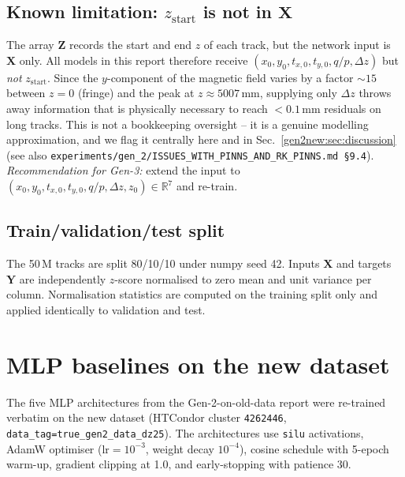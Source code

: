 \documentclass[a4paper,11pt]{article}
\newcommand{\qop}{q/p}
\newcommand{\dz}{\Delta z}
\begin{document}
\subsection{Known limitation: $z_{\mathrm{start}}$ is not in $\mathbf{X}$}

The array $\mathbf{Z}$ records the start and end $z$ of each track, but
the network input is $\mathbf{X}$ only. All models in this report
therefore receive $(x_0,y_0,t_{x,0},t_{y,0},\qop,\dz)$ but \emph{not}
$z_{\mathrm{start}}$. Since the $y$-component of the magnetic field
varies by a factor ${\sim}15$ between $z=0$ (fringe) and the peak at
$z\approx5007$\,mm, supplying only $\dz$ throws away information
that is physically necessary to reach ${<}0.1$\,mm residuals on long
tracks. This is not a bookkeeping oversight -- it is a genuine
modelling approximation, and we flag it centrally here and in
Sec.~\ref{gen2new:sec:discussion} (see also
\texttt{experiments/gen\_2/ISSUES\_WITH\_PINNS\_AND\_RK\_PINNS.md
\S9.4}). \emph{Recommendation for Gen-3:} extend the input to
$(x_0,y_0,t_{x,0},t_{y,0},\qop,\dz,z_0)\in\mathbb{R}^{7}$ and
re-train.

\subsection{Train/validation/test split}

The 50\,M tracks are split 80/10/10 under numpy seed 42.
Inputs $\mathbf{X}$ and targets $\mathbf{Y}$ are independently
$z$-score normalised to zero mean and unit variance per column.
Normalisation statistics are computed on the training split only and
applied identically to validation and test.

\section{MLP baselines on the new dataset}\label{gen2new:sec:mlp_baselines}

The five MLP architectures from the Gen-2-on-old-data report were
re-trained verbatim on the new dataset (HTCondor cluster
\texttt{4262446}, \texttt{data\_tag=true\_gen2\_data\_dz25}). The
architectures use \texttt{silu} activations, AdamW optimiser
($\mathrm{lr}=10^{-3}$, weight decay $10^{-4}$), cosine schedule
with 5-epoch warm-up, gradient clipping at 1.0, and early-stopping
with patience 30.
\end{document}
